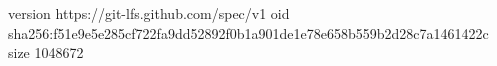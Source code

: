 version https://git-lfs.github.com/spec/v1
oid sha256:f51e9e5e285cf722fa9dd52892f0b1a901de1e78e658b559b2d28c7a1461422c
size 1048672
